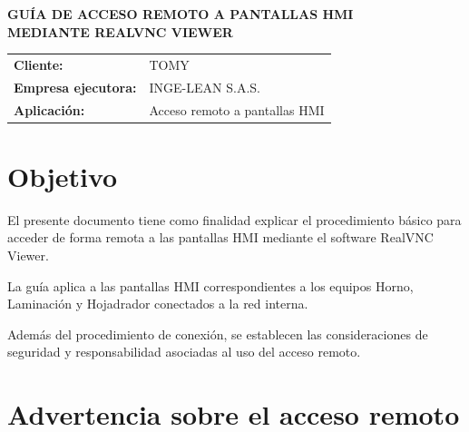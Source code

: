 \documentclass[11pt,a4paper]{article}
\newcommand{\TituloDocumento}
{GUÍA DE ACCESO REMOTO A PANTALLAS HMI\\
MEDIANTE REALVNC VIEWER}
\newcommand{\Cliente}
{TOMY}
\newcommand{\EmpresaEmisora}
{INGE-LEAN S.A.S.}
\begin{document}

\vspace*{0.02cm}

\begin{center}

{\LARGE\bfseries
\TituloDocumento
}

\vspace{0.55cm}

\vspace{0.55cm}

\begin{tabular}{>{\bfseries}l l}

Cliente: &
\Cliente
\\[0.14cm]

Empresa ejecutora: &
\EmpresaEmisora
\\[0.14cm]

Aplicación: &
Acceso remoto a pantallas HMI
\\

\end{tabular}

\end{center}

\vspace{0.30cm}

\section{Objetivo}

El presente documento tiene como finalidad explicar el procedimiento
básico para acceder de forma remota a las pantallas HMI mediante el
software RealVNC Viewer.

La guía aplica a las pantallas HMI correspondientes a los equipos Horno,
Laminación y Hojadrador conectados a la red interna.

Además del procedimiento de conexión, se establecen las consideraciones
de seguridad y responsabilidad asociadas al uso del acceso remoto.

\section{Advertencia sobre el acceso remoto}
\end{document}

